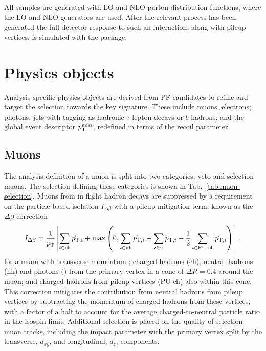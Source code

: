 All samples are generated with \NNPDF \cite{Ball:2014uwa} LO and NLO parton
distribution functions, where the LO and NLO generators are used. After the
relevant process has been generated the full detector response to such an
interaction, along with pileup vertices, is simulated with the \GEANT
\cite{AGOSTINELLI2003250} package.


\section{Physics objects}

Analysis specific physics objects are derived from PF candidates to refine and
target the selection towards the key signature. These include muons;
electrons; photons; jets with tagging as hadronic $\tau$-lepton decays or
$b$-hadrons; and the global event descriptor $p_{\text{T}}^{\mathrm{miss}}$, redefined in terms of
the recoil parameter.

\subsection{Muons}

The analysis definition of a muon is split into two categories: veto and
selection muons. The selection defining these categories is shown in
Tab.~\ref{tab:muon-selection}. Muons from in flight hadron decays are
suppressed by a requirement on the particle-based isolation $I_{\Delta\beta}$
with a pileup mitigation term, known as the $\Delta\beta$ correction
%
\begin{equation}
    I_{\Delta\beta} = \frac{1}{p_{\text{T}}}\left| \sum_{i\in\mathrm{ch}}\vec{p}_{\mathrm{T},i} + \max\left( 0, \sum_{i\in\mathrm{nh}}\vec{p}_{\mathrm{T},i} + \sum_{i\in\gamma}\vec{p}_{\mathrm{T},i} - \frac{1}{2}\sum_{i\in\mathrm{PU\ ch}}\vec{p}_{\mathrm{T},i} \right)\right|\ ,
\end{equation}
%
for a muon with transverse momentum \pt; charged hadrons (ch), neutral hadrons
(nh) and photons (\Pgamma) from the primary vertex in a cone of $\Delta R=0.4$
around the muon; and charged hadrons from pileup vertices (PU ch) also within
this cone. This correction mitigates the contribution from neutral hadrons
from pileup vertices by subtracting the momentum of charged hadrons from these
vertices, with a factor of a half to account for the average
charged-to-neutral particle ratio in the isospin limit. Additional selection
is placed on the quality of selection muon tracks, including the impact
parameter with the primary vertex split by the transverse, $d_{xy}$, and
longitudinal, $d_{z}$, components.

